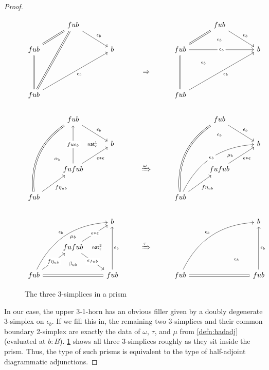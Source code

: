 \documentclass{amsart}
\theoremstyle{plain}
\theoremstyle{definition}
\theoremstyle{remark}
\numberwithin{equation}{section}
\begin{document}
\begin{proof}
  \begin{figure}
    \centering
\[
  \begin{tikzcd}[ampersand replacement=\&]
    \& fub \ar[dr,"\epsilon_b"] \& \& \&    \& fub \ar[dr,"\epsilon_b"] \ar[d,phantom,"\scriptstyle \epsilon_b"]\\
    fub \ar[ur,equals] \&\& b\& \&     fub \ar[ur,equals] \ar[rr,"\epsilon_b" description] \& ~ \& b\\
    \& \& \& \Rightarrow \&    \& \ar[ul,phantom,"\scriptstyle \epsilon_b"]\\
    fub \ar[uu,equals] \ar[ruuu,equals] \ar[rruu,"\epsilon_b"']\& \& \& \&    fub \ar[uu,equals] \ar[rruu,"\epsilon_b"']
\\
    \& fub \ar[dr,"\epsilon_b"]\& \& \&   \& fub \ar[dr,"\epsilon_b"] \ar[dd,phantom,"\scriptstyle \epsilon_b" near start] \& ~\\
    ~\& ~ \ar[r,phantom,"\scriptstyle \mathsf{nat}^1_{\epsilon}"] \& b \& \&      \& ~ \& b\\
    \& fufub \ar[ul,phantom,"\scriptstyle \alpha_b" near start] \ar[uu,"fu\epsilon_b" description] \ar[ur,"\epsilon\ast\epsilon"'] \& \& \xRightarrow{\omega} \&    \& fufub \ar[ur,"\epsilon\ast\epsilon"'] \ar[uur,phantom,"\scriptstyle \mu_b" pos=.2] \\
    fub \ar[ur,"f\eta_{ub}"']  \ar[ruuu,equals,bend left] \&~\& \& \&  fub \ar[uuur,equals,bend left] \ar[rruu,bend left,"\epsilon_b" description] \ar[ur,"f\eta_{ub}"']\\
    \&~\& b \& \&     \& \& b\\
    \& fufub \ar[dr,"\epsilon_{fub}" description] \ar[ur,"\epsilon\ast\epsilon" description] \ar[u,phantom,"\scriptstyle \mu_b" pos=.3]
    \ar[d,phantom,"\scriptstyle \beta_{ub}"]  \ar[r,phantom,"\scriptstyle \mathsf{nat}^2_{\epsilon}"] \& ~ \& \xRightarrow{\tau} \&    \& \ar[dr,phantom,"\scriptstyle \epsilon_b"]\& \\
    fub \ar[ur,"f\eta_{ub}" description] \ar[rr,equals] \ar[rruu,bend left,"\epsilon_b"] \&~\& fub\ar[uu,"\epsilon_b"']
\& \& 
    fub \ar[rr,equals] \ar[rruu,bend left, "\epsilon_b"] \&\& fub \ar[uu,"\epsilon_b"']
  \end{tikzcd}
\]
\caption{The three 3-simplices in a prism}
    \label{fig:three-3simplices}
  \end{figure}
  In our case, the upper 3-1-horn has an obvious filler given by a doubly degenerate 3-simplex on $\epsilon_b$.
  If we fill this in, the remaining two 3-simplices and their common boundary 2-simplex are exactly the data of $\omega$, $\tau$, and $\mu$ from \cref{defn:hadadj} (evaluated at $b:B$).
  \cref{fig:three-3simplices} shows all three 3-simplices roughly as they sit inside the prism.
  Thus, the type of such prisms is equivalent to the type of half-adjoint diagrammatic adjunctions.
\end{proof}
\end{document}
